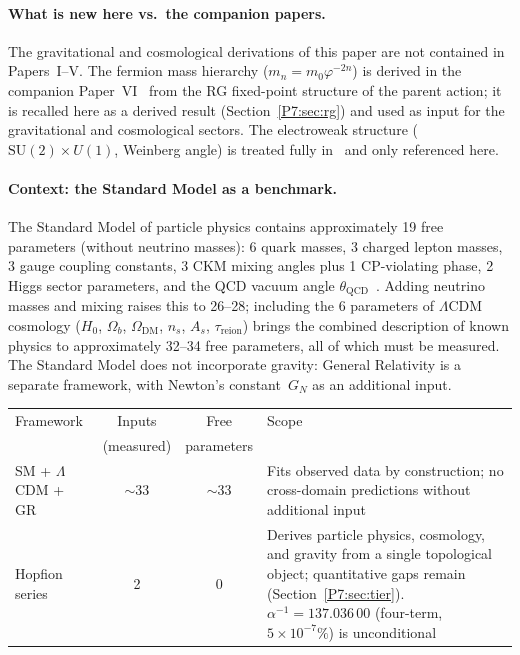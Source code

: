 \documentclass[11pt,a4paper]{article}
\theoremstyle{definition}
\theoremstyle{remark}
\newcommand{\vp}{\varphi}
\begin{document}
\paragraph{What is new here vs.\ the companion papers.}
The gravitational and cosmological derivations of this paper are
not contained in Papers~I--V.  The fermion mass hierarchy
($m_n = m_0\vp^{-2n}$) is derived in the companion Paper~VI~\cite{Paper6}
from the RG fixed-point structure of the parent action; it is recalled
here as a derived result (Section~\ref{P7:sec:rg}) and used as input for the
gravitational and cosmological sectors.  The electroweak structure
($\mathrm{SU}(2)\times U(1)$, Weinberg angle) is treated fully
in~\cite{Paper1,Paper4} and only referenced here.

\paragraph{Context: the Standard Model as a benchmark.}
The Standard Model of particle physics contains approximately 19 free
parameters (without neutrino masses): 6 quark masses, 3 charged lepton
masses, 3 gauge coupling constants, 3 CKM mixing angles plus 1
CP-violating phase, 2 Higgs sector parameters, and the QCD vacuum
angle $\theta_{\mathrm{QCD}}$~\cite{PDG2024}.
Adding neutrino masses and mixing raises this to 26--28; including
the 6 parameters of $\Lambda$CDM cosmology ($H_0$, $\Omega_b$,
$\Omega_{\mathrm{DM}}$, $n_s$, $A_s$, $\tau_{\mathrm{reion}}$) brings
the combined description of known physics to approximately 32--34 free
parameters, all of which must be measured.
The Standard Model does not incorporate gravity: General Relativity
is a separate framework, with Newton's constant~$G_N$ as an additional
input.

\begin{center}
\renewcommand{\arraystretch}{1.35}
\begin{tabular}{lccp{5.5cm}}
\toprule
Framework & Inputs & Free & Scope \\
 & (measured) & parameters & \\
\midrule
SM + $\Lambda$CDM + GR & $\sim$33 & $\sim$33 & Fits observed data by construction; no cross-domain
predictions without additional input \\[6pt]
Hopfion series & 2 & 0 & Derives particle physics, cosmology, and gravity from a
single topological object; quantitative gaps remain (Section~\ref{P7:sec:tier}).
$\alpha^{-1}=137.036\,00$ (four-term, $5\times10^{-7}\%$) is unconditional~\cite{Paper4} \\
\bottomrule
\end{tabular}
\end{center}
\end{document}
